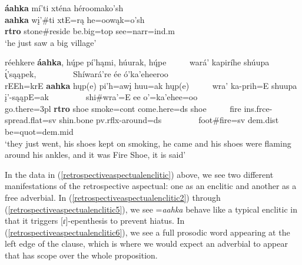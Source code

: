 \begin{exe}
\begin{xlist}
	\item\label{retrospectiveaspectualenclitic6}
	\glll \textbf{áahka} mí'ti xténa héroomako'sh\\
	\textbf{aahka} wį'\#ti xtE=rą he=oowąk=o'sh\\
	\textbf{rtro} \textnormal{stone}\#\textnormal{reside} \textnormal{be.big}=top \textnormal{see}=narr=ind.m\\
	\glt `he just saw a big village' \citep[105]{hollow1973b}

	\item\label{retrospectiveaspectualenclitic7}
	\glll réehkere \textbf{áahka}, hų́pe pí'hąmi, húurak, hų́pe ~ ~ ~ wará' kapiríhe shúupa \'{ı̨}'sąąpek, ~ ~ ~ ~ ~ Shíwará're ée ó'ka'eheeroo\\
	rEEh=krE \textbf{aahka} hųp(e) pi'h=awį huu=ak hųp(e) ~ ~ ~ wra' ka-prih=E shuupa į'-sąąpE=ak ~ ~ ~ ~ ~ shi\#wra'=E ee o'=ka'ehee=oo\\
	\textnormal{go.there}=3pl \textbf{rtro} \textnormal{shoe} \textnormal{smoke}=cont \textnormal{come.here}=ds \textnormal{shoe} ~ ~ ~ \textnormal{fire} ins.frce-\textnormal{spread.flat}=sv \textnormal{shin.bone} pv.rflx-\textnormal{around}=ds ~ ~ ~ ~ ~ \textnormal{foot}\#\textnormal{fire}=sv dem.dist \textnormal{be}=quot=dem.mid\\
	\glt `they just went, his shoes kept on smoking, he came and his shoes were flaming around his ankles, and it was Fire Shoe, it is said' \citep[146]{hollow1973a}
	
	\end{xlist}

\end{exe}

In the data in (\ref{retrospectiveaspectualenclitic}) above, we see two different manifestations of the retrospective aspectual: one as an enclitic and another as a free adverbial. In (\ref{retrospectiveaspectualenclitic2}) through (\ref{retrospectiveaspectualenclitic5}), we see =\textit{aahka} behave like a typical enclitic in that it triggers [ɾ]-epenthesis to prevent hiatus. In (\ref{retrospectiveaspectualenclitic6}), we see a full prosodic word appearing at the left edge of the clause, which is where we would expect an adverbial to appear that has scope over the whole proposition.


